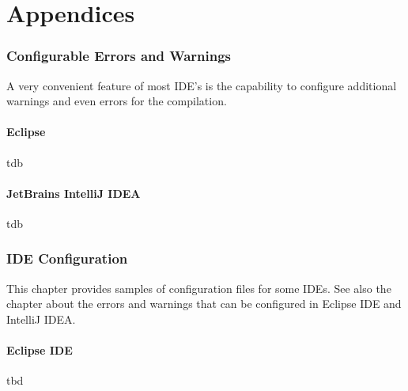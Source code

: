 \part{Appendices}\label{sec:Appendices}


\section{Configurable Errors and Warnings}\label{sec:ConfigurableErrorsAndWarnings}
A very convenient feature of most IDE's is the capability to configure additional warnings and even errors for the compilation.


\subsection{Eclipse}\label{sec:EclipseErrorsAndWarnings}
tdb


\subsection{JetBrains IntelliJ IDEA}\label{sec:IntelliJErrorsAndWarnings}
tdb


\section{IDE Configuration}\label{sec:IDEConfiguration}
This chapter provides samples of configuration files for some IDEs. See also the chapter  about the errors and warnings that can be configured in Eclipse IDE and IntelliJ IDEA.


\subsection{Eclipse IDE}\label{sec:EclipseConfiguration}
tbd

